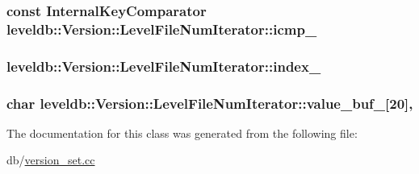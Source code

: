\subsubsection[{icmp\+\_\+}]{\setlength{\rightskip}{0pt plus 5cm}const {\bf Internal\+Key\+Comparator} leveldb\+::\+Version\+::\+Level\+File\+Num\+Iterator\+::icmp\+\_\+\hspace{0.3cm}{\ttfamily [private]}}\label{classleveldb_1_1_version_1_1_level_file_num_iterator_ad8b3dcc45dfb991e9aabcd751b5b5138}
\hypertarget{classleveldb_1_1_version_1_1_level_file_num_iterator_ab09093aba9e4fb4ef28ea8235bf26c14}{}
\subsubsection[{index\+\_\+}]{ leveldb\+::\+Version\+::\+Level\+File\+Num\+Iterator\+::index\+\_\+\hspace{0.3cm}{\ttfamily [private]}}\label{classleveldb_1_1_version_1_1_level_file_num_iterator_ab09093aba9e4fb4ef28ea8235bf26c14}
\hypertarget{classleveldb_1_1_version_1_1_level_file_num_iterator_a2bac187803fa49e2e42e5121ac12243e}{}
\subsubsection[{value\+\_\+buf\+\_\+}]{\setlength{\rightskip}{0pt plus 5cm}char leveldb\+::\+Version\+::\+Level\+File\+Num\+Iterator\+::value\+\_\+buf\+\_\+\mbox{[}20\mbox{]}\hspace{0.3cm}{\ttfamily [mutable]}, {\ttfamily [private]}}\label{classleveldb_1_1_version_1_1_level_file_num_iterator_a2bac187803fa49e2e42e5121ac12243e}


The documentation for this class was generated from the following file\+:\begin{DoxyCompactItemize}
\item 
db/\hyperlink{version__set_8cc}{version\+\_\+set.\+cc}\end{DoxyCompactItemize}

